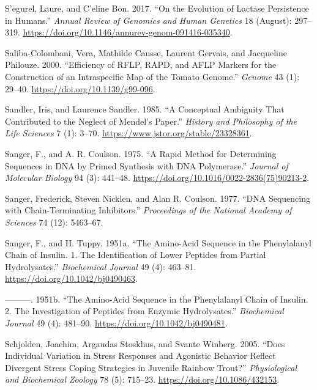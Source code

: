 \documentclass[
]{book}
\newlength{\cslhangindent}
\newlength{\cslentryspacingunit} %
\newenvironment{CSLReferences}[2] %
 {%
  \setlength{\parindent}{0pt}
  \ifodd #1
  \let\oldpar\par
  \def\par{\hangindent=\cslhangindent\oldpar}
  \fi
  \setlength{\parskip}{#2\cslentryspacingunit}
 }%
 {}
\begin{document}
\begin{CSLReferences}{1}{0}
\leavevmode{}%
S'egurel, Laure, and C'eline Bon. 2017. {``On the {Evolution} of {Lactase Persistence} in {Humans}.''} \emph{Annual Review of Genomics and Human Genetics} 18 (August): 297--319. \url{https://doi.org/10.1146/annurev-genom-091416-035340}.

\leavevmode{}%
Saliba-Colombani, Vera, Mathilde Causse, Laurent Gervais, and Jacqueline Philouze. 2000. {``Efficiency of {RFLP}, {RAPD}, and {AFLP} Markers for the Construction of an Intraspecific Map of the Tomato Genome.''} \emph{Genome} 43 (1): 29--40. \url{https://doi.org/10.1139/g99-096}.

\leavevmode{}%
Sandler, Iris, and Laurence Sandler. 1985. {``A {Conceptual Ambiguity} That {Contributed} to the {Neglect} of {Mendel}'s {Paper}.''} \emph{History and Philosophy of the Life Sciences} 7 (1): 3--70. \url{https://www.jstor.org/stable/23328361}.

\leavevmode{}%
Sanger, F., and A. R. Coulson. 1975. {``A Rapid Method for Determining Sequences in {DNA} by Primed Synthesis with {DNA} Polymerase.''} \emph{Journal of Molecular Biology} 94 (3): 441--48. \url{https://doi.org/10.1016/0022-2836(75)90213-2}.

\leavevmode{}%
Sanger, Frederick, Steven Nicklen, and Alan R. Coulson. 1977. {``{DNA} Sequencing with Chain-Terminating Inhibitors.''} \emph{Proceedings of the National Academy of Sciences} 74 (12): 5463--67.

\leavevmode{}%
Sanger, F., and H. Tuppy. 1951a. {``The Amino-Acid Sequence in the Phenylalanyl Chain of Insulin. 1. {The} Identification of Lower Peptides from Partial Hydrolysates.''} \emph{Biochemical Journal} 49 (4): 463--81. \url{https://doi.org/10.1042/bj0490463}.

\leavevmode{}%
---------. 1951b. {``The Amino-Acid Sequence in the Phenylalanyl Chain of Insulin. 2. {The} Investigation of Peptides from Enzymic Hydrolysates.''} \emph{Biochemical Journal} 49 (4): 481--90. \url{https://doi.org/10.1042/bj0490481}.

\leavevmode{}%
Schjolden, Joachim, Argaudas Stoskhus, and Svante Winberg. 2005. {``Does {Individual Variation} in {Stress Responses} and {Agonistic Behavior Reflect Divergent Stress Coping Strategies} in {Juvenile Rainbow Trout}?''} \emph{Physiological and Biochemical Zoology} 78 (5): 715--23. \url{https://doi.org/10.1086/432153}.


\end{CSLReferences}
\end{document}
